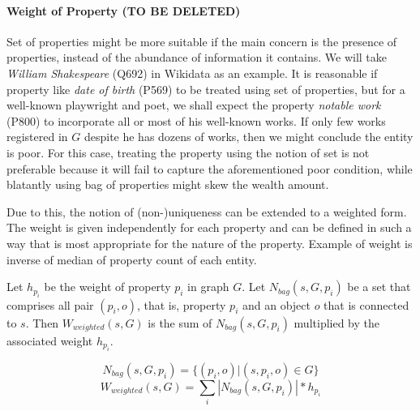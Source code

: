 \paragraph{Weight of Property (TO BE DELETED)}


Set of properties might be more suitable if the main concern is the presence of properties, instead of the abundance of information it contains. We will take \textit{William Shakespeare} (Q692) in Wikidata as an example. It is reasonable if property like  \textit{date of birth} (P569) to be treated using set of properties, but for a well-known playwright and poet, we shall expect the property \textit{notable work} (P800) to incorporate all or most of his well-known works. If only few works registered in \(G\) despite he has dozens of works, then we might conclude the entity is poor. For this case, treating the property using the notion of set is not preferable because it will fail to capture the aforementioned poor condition, while blatantly using bag of properties might skew the wealth amount.

Due to this, the notion of (non-)uniqueness can be extended to a weighted form. The weight is given independently for each property and can be defined in such a way that is most appropriate for the nature of the property. Example of weight is inverse of median of property count of each entity.

Let \(h_{p_i}\) be the weight of property \(p_i\) in graph \(G\). Let \(N_{bag}(s,G,p_i)\) be a set that comprises all pair  \((p_i,o)\), that is, property \(p_i\) and an object \(o\) that is connected to \(s\). Then \(W_{weighted}(s, G)\) is the sum of \(N_{bag}(s,G,p_i)\) multiplied by the associated weight \(h_{p_i}\).


\[
    N_{bag}(s,G,p_i) = \{(p_i, o) | (s, p_i, o) \in G\}
\]
\[
    W_{weighted}(s, G) = \sum_i |N_{bag}(s,G,p_i)| * h_{p_i}
\]

